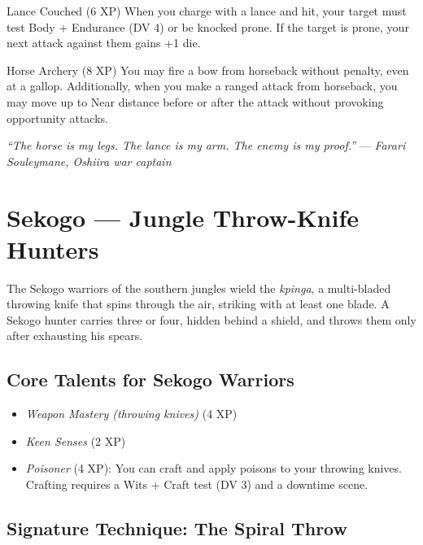 \documentclass[9pt,a5paper]{extbook}
\begin{document}
\begin{talentbox}{Lance Couched (6 XP)}
When you charge with a lance and hit, your target must test Body + Endurance (DV 4) or be knocked prone. If the target is prone, your next attack against them gains +1 die.
\end{talentbox}

\begin{talentbox}{Horse Archery (8 XP)}
You may fire a bow from horseback without penalty, even at a gallop. Additionally, when you make a ranged attack from horseback, you may move up to Near distance before or after the attack without provoking opportunity attacks.
\end{talentbox}

\vspace{0.2cm}
\noindent\textit{``The horse is my legs. The lance is my arm. The enemy is my proof.''}  
\hfill --- \textit{Farari Souleymane, Oshiira war captain}

\clearpage

\section{Sekogo --- Jungle Throw-Knife Hunters}

The Sekogo warriors of the southern jungles wield the \textit{kpinga}, a multi-bladed throwing knife that spins through the air, striking with at least one blade. A Sekogo hunter carries three or four, hidden behind a shield, and throws them only after exhausting his spears.

\subsection{Core Talents for Sekogo Warriors}
\begin{itemize}
    \item \textit{Weapon Mastery (throwing knives)} (4 XP)
    \item \textit{Keen Senses} (2 XP)
    \item \textit{Poisoner} (4 XP): You can craft and apply poisons to your throwing knives. Crafting requires a Wits + Craft test (DV 3) and a downtime scene.
\end{itemize}

\subsection{Signature Technique: The Spiral Throw}
\end{document}
